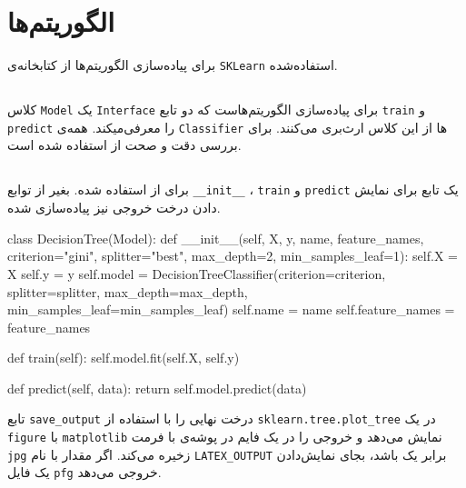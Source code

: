 \chapter{الگوریتم‌ها}
برای پیاده‌سازی الگوریتم‌ها از کتابخانه‌ی
\verb;SKLearn;
استفاده‌شده.

\section{}
کلاس
\verb;Model;
یک
\verb;Interface;
برای پیاده‌سازی الگوریتم‌هاست که دو تابع
\verb;train;
و
\verb;predict;
را معرفی‌میکند.
همه‌ی
\verb;Classifier;
ها از این کلاس ارث‌بری می‌کنند.
برای بررسی دقت و صحت از
استفاده شده است.

\section{}
برای
از
استفاده شده.
بغیر از توابع
\verb;__init__;
،
\verb;train;
و
\verb;predict;
یک تابع برای نمایش دادن درخت خروجی نیز پیاده‌سازی شده.

\begin{latin}
  \begin{python}
class DecisionTree(Model):
    def __init__(self, X, y, name, feature_names, criterion="gini", splitter="best",
            max_depth=2, min_samples_leaf=1):
        self.X = X
        self.y = y
        self.model = DecisionTreeClassifier(criterion=criterion, splitter=splitter,
                max_depth=max_depth, min_samples_leaf=min_samples_leaf)
        self.name = name
        self.feature_names = feature_names

    def train(self):
        self.model.fit(self.X, self.y)

    def predict(self, data):
        return self.model.predict(data)
  \end{python}
\end{latin}


تابع
\verb;save_output;
درخت نهایی را با استفاده از
\verb;sklearn.tree.plot_tree;
در یک
\verb;figure;
با
\verb;matplotlib;
نمایش می‌دهد و خروجی را در یک فایم در پوشه‌ی
با فرمت
\verb;jpg;
زخیره می‌کند.
اگر مقدار
با نام
\verb;LATEX_OUTPUT;
برابر یک باشد، بجای نمایش‌دادن یک فایل
\verb;pfg;
خروجی می‌دهد.


